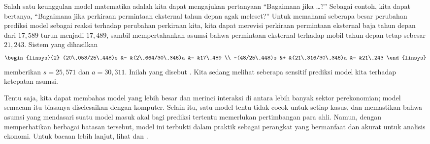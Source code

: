 Salah satu keunggulan model matematika adalah kita dapat
mengajukan pertanyaan ``Bagaimana jika \ldots?''
Sebagai contoh, kita dapat bertanya,
``Bagaimana jika perkiraan permintaan eksternal tahun depan agak meleset?''
Untuk memahami seberapa besar perubahan prediksi model sebagai
reaksi terhadap perubahan perkiraan kita, kita dapat merevisi perkiraan
permintaan eksternal baja tahun depan dari $17,589$ turun menjadi
$17,489$, sambil mempertahankan asumsi bahwa permintaan eksternal terhadap
mobil tahun depan tetap sebesar $21,243$.
Sistem yang dihasilkan
\begin{equation*}
  \begin{linsys}{2}
        (20\,053/25\,448)s &- &(2\,664/30\,346)a &= &17\,489 \\
      -(48/25\,448)s      &+ &(21\,316/30\,346)a &= &21\,243
  \end{linsys}
\end{equation*}
memberikan $s=25,571$ dan $a=30,311$.
Inilah yang disebut .
Kita sedang melihat seberapa sensitif prediksi model kita terhadap
ketepatan asumsi.

Tentu saja, kita dapat membahas model yang lebih besar dan merinci interaksi
di antara lebih banyak sektor perekonomian;
model semacam itu biasanya diselesaikan dengan komputer.
Selain itu, satu model tentu tidak cocok untuk setiap kasus, dan
memastikan bahwa asumsi yang mendasari suatu model
masuk akal bagi prediksi tertentu memerlukan pertimbangan para ahli.
Namun, dengan memperhatikan berbagai batasan tersebut,
model ini terbukti dalam praktik sebagai perangkat yang bermanfaat dan akurat
untuk analisis ekonomi.
Untuk bacaan lebih lanjut, lihat \cite{Leontief1951} dan \cite{Leontief1965}.


